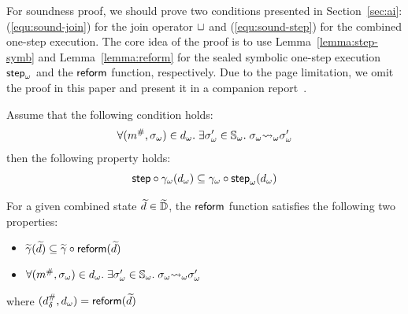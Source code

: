 For soundness proof, we should prove 
two conditions presented in Section~\ref{sec:ai}:
(\ref{equ:sound-join}) for the join operator $\sqcup$ and
(\ref{equ:sound-step}) for the combined one-step execution.
The core idea of the proof is to use Lemma~\ref{lemma:step-symb} and
Lemma~\ref{lemma:reform} for the sealed symbolic one-step execution
${\textsf{step}}_\omega$ and the $\textsf{reform}$ function, respectively. Due to the page limitation, we omit
the proof in this paper and present it in a companion report~\cite{report}.
\begin{lemma}\label{lemma:step-symb}
  Assume that the following condition holds:
  \[
    \forall ({m}^{\#}, {\sigma}_\omega) \in {{d}_\omega}. \; \exists {\sigma}_\omega' \in
    {\mathbb{S}}_\omega. \; {\sigma}_\omega {\leadsto}_\omega {\sigma}_\omega'
  \]
  then the following property holds:
  \[
    \textsf{step} \circ {\gamma}_\omega({{d}_\omega}) \subseteq
    {\gamma}_\omega \circ {\textsf{step}}_\omega({{d}_\omega})\\
  \]
\end{lemma}
\begin{lemma}\label{lemma:reform}
  For a given combined state $\widetilde{d} \in \widetilde{\mathbb{D}}$, the $\textsf{reform}$ function
  satisfies the following two properties:
  \begin{itemize}
    \item $\widetilde{\gamma}(\widetilde{d}) \subseteq \widetilde{\gamma} \circ \textsf{reform}(\widetilde{d})$
    \item $\forall ({m}^{\#}, {\sigma}_\omega) \in {{d}_\omega}. \; \exists {\sigma}_\omega' \in
      {\mathbb{S}}_\omega.  \; {\sigma}_\omega {\leadsto}_\omega {\sigma}_\omega'$
  \end{itemize}
  where $({{d}^{\#}_\delta}, {{d}_\omega}) = \textsf{reform}(\widetilde{d})$
\end{lemma}
